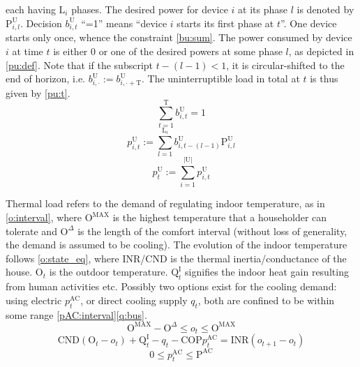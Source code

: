 \documentclass[journal]{IEEEtran}
\begin{document}
each having $\mathrm{L}_i$ phases.
The desired power for device $i$ at its phase $l$ is denoted by $\mathrm{P}^\mathrm{U}_{i, l}$.
Decision $b^\mathrm{U}_{i, t}$ ``=1'' means ``device $i$ starts its first phase at $t$''.
One device starts only once, whence the constraint \eqref{bu:sum}.
The power consumed by device $i$ at time $t$ is either $0$ or one of the desired powers at some phase $l$,
as depicted in \eqref{pu:def}.
Note that if the subscript $t - (l-1) < 1$, it is circular-shifted to the end of horizon,
i.e. $b^\mathrm{U}_{i, \boldsymbol{\cdot}} := b^\mathrm{U}_{i, \boldsymbol{\cdot} + \mathrm{T}}$.
The uninterruptible load in total at $t$ is thus given by \eqref{pu:t}.
\begin{equation}\label{bu:sum}
    \sum_{t = 1}^\mathrm{T} b^\mathrm{U}_{i, t} = 1
\end{equation}
\begin{equation}\label{pu:def}
    p^\mathrm{U}_{i, t} := \sum_{l=1}^{\mathrm{L}_i} b^\mathrm{U}_{i, t - (l-1)} \mathrm{P}^\mathrm{U}_{i, l}
\end{equation}
\begin{equation}\label{pu:t}
    p^\mathrm{U}_t := \sum_{i = 1}^{|\mathrm{U}|} p^\mathrm{U}_{i, t}
\end{equation}
\par
Thermal load refers to the demand of regulating indoor temperature,
as in \eqref{o:interval}, where $\mathrm{O}^\mathrm{MAX}$ is the highest
temperature that a householder can tolerate and $\mathrm{O}^\Delta$ is the
length of the comfort interval (without loss of generality,
the demand is assumed to be cooling).
The evolution of the indoor temperature follows \eqref{o:state_eq}, where
INR/CND is the thermal inertia/conductance of the house.
$\mathrm{O}_t$ is the outdoor temperature.
$\mathrm{Q}^\mathrm{I}_t$ signifies the indoor heat gain resulting from human activities etc.
Possibly two options exist for the cooling demand: using electric $p^\mathrm{AC}_t$,
or direct cooling supply $q_t$, both are confined to be within some range \eqref{pAC:interval}\eqref{q:bus}.
\begin{equation}\label{o:interval}
    \mathrm{O}^\mathrm{MAX} - \mathrm{O}^\Delta \le o_t \le \mathrm{O}^\mathrm{MAX}
\end{equation}
\begin{equation}\label{o:state_eq}
    \mathrm{CND}(\mathrm{O}_t - o_t) + \mathrm{Q}^\mathrm{I}_t - q_t - \mathrm{COP} p^\mathrm{AC}_t = \mathrm{INR}(o_{t+1}-o_t)
\end{equation}
\begin{equation}\label{pAC:interval}
    0 \le p^\mathrm{AC}_t \le \mathrm{P}^\mathrm{AC}
\end{equation}
\end{document}
